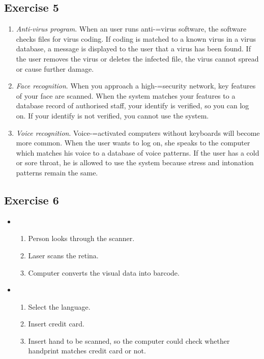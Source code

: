 \documentclass[a5paper,10pt,notitlepage,pdftex,headsepline]{scrartcl}
\begin{document}
  \subsection{Exercise 5}
    \begin{enumerate}
      \item \textit{Anti-virus program}.
        When an user runs anti-=virus software, the software checks files for
        virus coding.
        If coding is matched to a known virus in a virus database, a message
        is displayed to the user that a virus has been found.
        If the user removes the virus or deletes the infected file, the virus
        cannot spread or cause further damage.
      \item \textit{Face recognition}.
        When you approach a high-=security network, key features of your face
        are scanned.
        When the system matches your features to a database record of
        authorised staff, your identify is verified, so you can log on.
        If your identify is not verified, you cannot use the system.
      \item \textit{Voice recognition}.
        Voice-=activated computers without keyboards will become more common.
        When the user wants to log on, she speaks to the computer which
        matches his voice to a database of voice patterns.
        If the user has a cold or sore throat, he is allowed to use the system
        because stress and intonation patterns remain the same.
    \end{enumerate}
  \subsection{Exercise 6}
    \begin{itemize}
      \item \begin{enumerate}
          \item Person looks through the scanner.
          \item Laser scans the retina.
          \item Computer converts the visual data into barcode.
        \end{enumerate}
      \item \begin{enumerate}
          \item Select the language.
          \item Insert credit card.
          \item Insert hand to be scanned, so the computer could check
            whether handprint matches credit card or not.
        \end{enumerate}
    \end{itemize}
\end{document}
